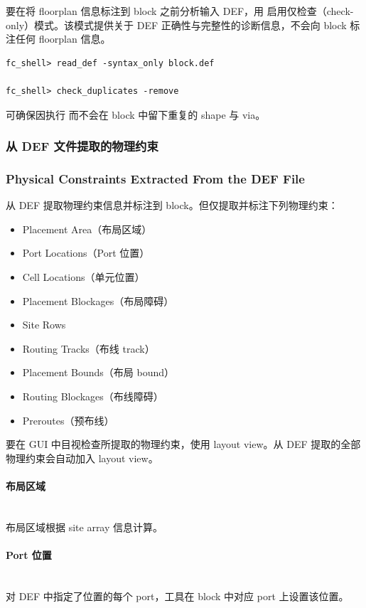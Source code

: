 要在将 floorplan 信息标注到 block 之前分析输入 DEF，用  启用仅检查（check-only）模式。该模式提供关于 DEF 正确性与完整性的诊断信息，不会向 block 标注任何 floorplan 信息。
\begin{lstlisting}
fc_shell> read_def -syntax_only block.def

fc_shell> check_duplicates -remove
\end{lstlisting}

 可确保因执行  而不会在 block 中留下重复的 shape 与 via。

\subsubsection{从 DEF 文件提取的物理约束}
\subsubsection*{Physical Constraints Extracted From the DEF File}

 从 DEF 提取物理约束信息并标注到 block。但仅提取并标注下列物理约束：
\begin{itemize}
  \item Placement Area（布局区域）
  \item Port Locations（Port 位置）
  \item Cell Locations（单元位置）
  \item Placement Blockages（布局障碍）
  \item Site Rows
  \item Routing Tracks（布线 track）
  \item Placement Bounds（布局 bound）
  \item Routing Blockages（布线障碍）
  \item Preroutes（预布线）
\end{itemize}

要在 GUI 中目视检查所提取的物理约束，使用 layout view。从 DEF 提取的全部物理约束会自动加入 layout view。

\paragraph{布局区域}\mbox{}\\
布局区域根据 site array 信息计算。

\paragraph{Port 位置}\mbox{}\\
对 DEF 中指定了位置的每个 port，工具在 block 中对应 port 上设置该位置。


